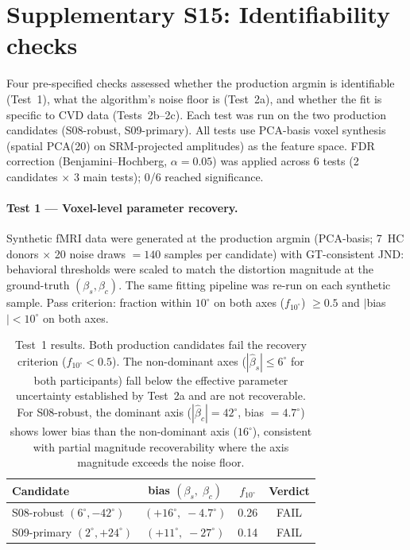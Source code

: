 
\section*{Supplementary S15: Identifiability checks}
\label{app:identifiability}

Four pre-specified checks assessed whether the production argmin
is identifiable (Test~1), what the algorithm's noise floor is
(Test~2a), and whether the fit is specific to CVD data
(Tests~2b--2c).
Each test was run on the two production candidates (S08-robust,
S09-primary).
All tests use PCA-basis voxel synthesis (spatial PCA(20) on
SRM-projected amplitudes) as the feature space.
FDR correction (Benjamini--Hochberg, $\alpha = 0.05$) was applied
across 6 tests (2 candidates $\times$ 3 main tests); 0/6 reached
significance.

\paragraph{Test 1 — Voxel-level parameter recovery.}

Synthetic fMRI data were generated at the production argmin
(PCA-basis; 7~HC donors $\times$ 20 noise draws $= 140$ samples
per candidate) with GT-consistent JND: behavioral thresholds were
scaled to match the distortion magnitude at the ground-truth
$(\beta_s, \beta_c)$.
The same fitting pipeline was re-run on each synthetic sample.
Pass criterion: fraction within $10^\circ$ on both axes
($f_{10^\circ}$) $\geq 0.5$ and $|$bias$| < 10^\circ$ on both axes.

\begin{table}[h]
\centering
\begin{tabular}{lccc}
\hline
Candidate & bias $(\beta_s,\; \beta_c)$ & $f_{10^\circ}$ & Verdict \\
\hline
S08-robust  $(6^\circ, -42^\circ)$  & $(+16^\circ,\; -4.7^\circ)$  & 0.26 & FAIL \\
S09-primary $(2^\circ, +24^\circ)$  & $(+11^\circ,\; -27^\circ)$  & 0.14 & FAIL \\
\hline
\end{tabular}
\caption{Test~1 results. Both production candidates fail the recovery
criterion ($f_{10^\circ} < 0.5$).
The non-dominant axes ($|\hat\beta_s| \leq 6^\circ$ for both
participants) fall below the effective parameter uncertainty
established by Test~2a and are not recoverable.
For S08-robust, the dominant axis ($|\hat\beta_c| = 42^\circ$, bias
$= 4.7^\circ$) shows lower bias than the non-dominant axis
($16^\circ$), consistent with partial magnitude recoverability
where the axis magnitude exceeds the noise floor.}
\end{table}

